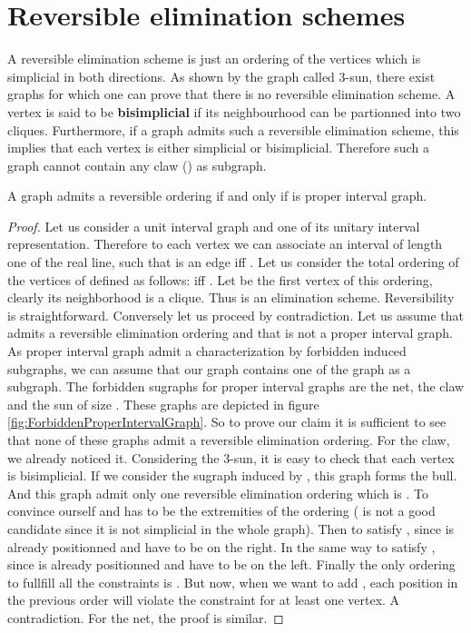 \documentclass{endm}
\begin{document}
\section{Reversible elimination schemes}


A  reversible elimination scheme is just an ordering of the vertices which is simplicial in both directions.
As shown by the graph  called 3-sun, there exist graphs for which one can prove that there is no
reversible elimination scheme. A vertex is said to be \textbf{bisimplicial} if its neighbourhood can be 
partionned into two cliques.
Furthermore, if a graph  admits such a reversible elimination scheme, this implies that each vertex is either simplicial or bisimplicial. Therefore such a graph cannot contain any claw () as subgraph. 


\begin{theorem}
A graph  admits a reversible ordering if and only if  is 
proper interval graph.
\end{theorem}
\begin{proof}
Let us consider a unit interval graph  and one of its unitary interval representation. Therefore to each vertex  we can associate
an interval  of length one of the real line, such that  is an edge iff  .
Let us consider the total ordering  of the vertices of  defined as follows:     iff  .
Let  be the first vertex of this ordering, clearly its neighborhood is a clique. Thus   is an elimination scheme. Reversibility is straightforward.
Conversely let us  proceed by contradiction. Let us assume that  admits a reversible elimination 
ordering and that  is not a proper interval graph. As proper interval 
graph admit a characterization by forbidden induced subgraphs, we can assume 
that our graph contains one of the graph as a subgraph. The forbidden sugraphs 
for proper interval graphs are the net, the claw and the sun of size . These 
graphs are depicted in figure \ref{fig:ForbiddenProperIntervalGraph}.
So to prove our claim it is sufficient to see that none of these graphs 
admit a reversible elimination ordering.
For the claw, we already noticed it.
Considering the 3-sun, it is easy to check that each vertex 
is bisimplicial. If we consider the sugraph induced by , 
this graph forms the bull. And this graph admit only one 
reversible elimination ordering which is . 
To convince ourself  and  has to be the extremities of the 
ordering ( is not a good candidate since it is not simplicial 
in the whole graph). Then to satisfy , since  is already 
positionned  and  have to be on the right. In the same 
way to satisfy , since  is already positionned 
 and  have to be on the left. Finally the only 
ordering to fullfill all the constraints is . But now, 
when we want to add , each position in the previous order 
will violate the constraint for at least one vertex. A contradiction.
For the net, the proof is similar. \end{proof}
\end{document}
